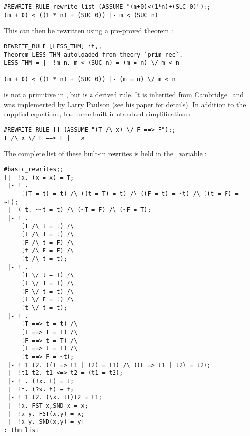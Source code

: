 \begin{session}\begin{verbatim}
#REWRITE_RULE rewrite_list (ASSUME "(m+0)<(1*n)+(SUC 0)");;
(m + 0) < ((1 * n) + (SUC 0)) |- m < (SUC n)
\end{verbatim}\end{session}

\noindent This can then be rewritten using a pre-proved theorem :

\begin{session}\begin{verbatim}
REWRITE_RULE [LESS_THM] it;;
Theorem LESS_THM autoloaded from theory `prim_rec`.
LESS_THM = |- !m n. m < (SUC n) = (m = n) \/ m < n

(m + 0) < ((1 * n) + (SUC 0)) |- (m = n) \/ m < n
\end{verbatim}\end{session}

 is not a primitive in \HOL, but is a derived rule. It is
inherited from Cambridge \LCF\ and was implemented by Larry Paulson (see
his paper \cite{lcp_rewrite} for details). In addition to the supplied equations,
 has some built in standard simplifications:

\begin{session}\begin{verbatim}
#REWRITE_RULE [] (ASSUME "(T /\ x) \/ F ==> F");;
T /\ x \/ F ==> F |- ~x
\end{verbatim}\end{session}

\noindent The complete list of these built-in rewrites is
held in the \ML\ variable :

\newpage %

\begin{session}\begin{verbatim}
#basic_rewrites;;
[|- !x. (x = x) = T;
 |- !t.
     ((T = t) = t) /\ ((t = T) = t) /\ ((F = t) = ~t) /\ ((t = F) = ~t);
 |- (!t. ~~t = t) /\ (~T = F) /\ (~F = T);
 |- !t.
     (T /\ t = t) /\
     (t /\ T = t) /\
     (F /\ t = F) /\
     (t /\ F = F) /\
     (t /\ t = t);
 |- !t.
     (T \/ t = T) /\
     (t \/ T = T) /\
     (F \/ t = t) /\
     (t \/ F = t) /\
     (t \/ t = t);
 |- !t.
     (T ==> t = t) /\
     (t ==> T = T) /\
     (F ==> t = T) /\
     (t ==> t = T) /\
     (t ==> F = ~t);
 |- !t1 t2. ((T => t1 | t2) = t1) /\ ((F => t1 | t2) = t2);
 |- !t1 t2. t1 <=> t2 = (t1 = t2);
 |- !t. (!x. t) = t;
 |- !t. (?x. t) = t;
 |- !t1 t2. (\x. t1)t2 = t1;
 |- !x. FST x,SND x = x;
 |- !x y. FST(x,y) = x;
 |- !x y. SND(x,y) = y]
: thm list
\end{verbatim}\end{session}

